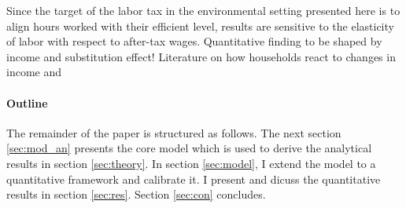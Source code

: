 Since the target of the labor tax in the environmental setting presented here is to align hours worked with their efficient level, results are sensitive to the elasticity of labor with respect to after-tax wages. 
Quantitative finding to be shaped by income and substitution effect!
Literature on how households react to changes in income \cite{Bick2018HowImplications} and \cite{Boppart2019LaborPerspectiveb}




\paragraph{Outline}
The remainder of the paper is structured as follows. The next section \ref{sec:mod_an} presents the core model which is used to derive the analytical results in section \ref{sec:theory}. In section \ref{sec:model}, I extend the model to a quantitative framework and calibrate it. I present and dicuss the quantitative results in section \ref{sec:res}. Section \ref{sec:con} concludes.